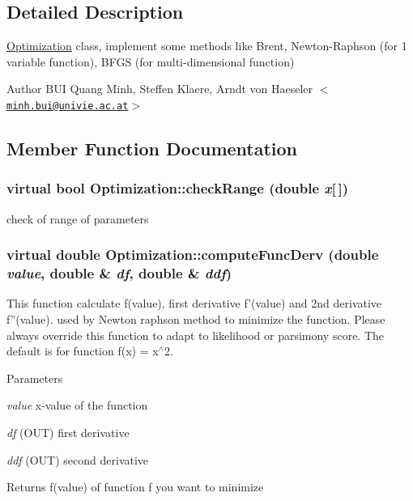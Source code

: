 \subsection{Detailed Description}
\hyperlink{classOptimization}{Optimization} class, implement some methods like Brent, Newton-\/Raphson (for 1 variable function), BFGS (for multi-\/dimensional function)

\begin{DoxyAuthor}{Author}
BUI Quang Minh, Steffen Klaere, Arndt von Haeseler $<$\href{mailto:minh.bui@univie.ac.at}{\tt minh.bui@univie.ac.at}$>$ 
\end{DoxyAuthor}


\subsection{Member Function Documentation}
\hypertarget{classOptimization_aa80661f2519aa3a9f1521309e854acfc}{
\subsubsection[{checkRange}]{\setlength{\rightskip}{0pt plus 5cm}virtual bool Optimization::checkRange (double {\em x}\mbox{[}$\,$\mbox{]})}}
\label{classOptimization_aa80661f2519aa3a9f1521309e854acfc}
check of range of parameters \hypertarget{classOptimization_a18bedacde6fd259ff5923c9e936464bd}{
\subsubsection[{computeFuncDerv}]{\setlength{\rightskip}{0pt plus 5cm}virtual double Optimization::computeFuncDerv (double {\em value}, \/  double \& {\em df}, \/  double \& {\em ddf})}}
\label{classOptimization_a18bedacde6fd259ff5923c9e936464bd}
This function calculate f(value), first derivative f'(value) and 2nd derivative f''(value). used by Newton raphson method to minimize the function. Please always override this function to adapt to likelihood or parsimony score. The default is for function f(x) = x$^\wedge$2. 
\begin{DoxyParams}{Parameters}
\item[{\em value}]x-\/value of the function \item[{\em df}](OUT) first derivative \item[{\em ddf}](OUT) second derivative \end{DoxyParams}
\begin{DoxyReturn}{Returns}
f(value) of function f you want to minimize 
\end{DoxyReturn}


